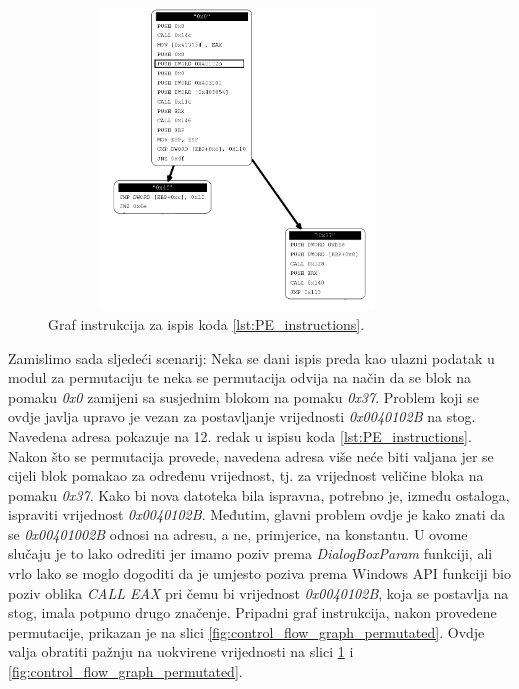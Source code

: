 \documentclass[times, utf8, diplomski, numeric]{fer}
\begin{document}
\begin{figure}[!htb]
\centering
\setlength\fboxsep{0pt}
\setlength\fboxrule{0.5pt}
\includegraphics[width=10cm, height=8cm]{slike/permutator_graph_part}
\caption{Graf instrukcija za ispis koda \ref{lst:PE_instructions}.}
\label{fig:control_flow_graph_pe} 
\end{figure}

Zamislimo sada sljedeći scenarij: Neka se dani ispis
preda kao ulazni podatak u modul za permutaciju te neka se
permutacija odvija na način da se blok na pomaku \emph{0x0}
zamijeni sa susjednim blokom na pomaku \emph{0x37}. 
Problem koji se ovdje javlja upravo je vezan za
postavljanje vrijednosti \emph{0x0040102B} na stog. Navedena
adresa pokazuje na 12. redak u ispisu koda 
\ref{lst:PE_instructions}. Nakon što se permutacija provede,
navedena adresa više neće biti valjana jer se cijeli blok pomakao
za određenu vrijednost, tj. za vrijednost veličine bloka na
pomaku \emph{0x37}. Kako bi nova datoteka bila ispravna,
potrebno je, između ostaloga, ispraviti vrijednost
\emph{0x0040102B}. Međutim, glavni problem ovdje je kako znati da
se \emph{0x00401002B} odnosi na adresu, a ne, primjerice, na
konstantu. U ovome slučaju je to lako odrediti jer imamo poziv
prema \emph{DialogBoxParam} funkciji, ali vrlo lako se moglo
dogoditi da je umjesto poziva prema Windows API funkciji bio
poziv oblika \emph{CALL EAX} pri čemu bi vrijednost
\emph{0x0040102B}, koja se postavlja na stog, imala potpuno drugo
značenje.  Pripadni graf instrukcija, nakon provedene
permutacije, prikazan je na slici 
\ref{fig:control_flow_graph_permutated}. Ovdje valja obratiti
pažnju na uokvirene vrijednosti na slici 
\ref{fig:control_flow_graph_pe} i \ref{fig:control_flow_graph_permutated}.
\end{document}
